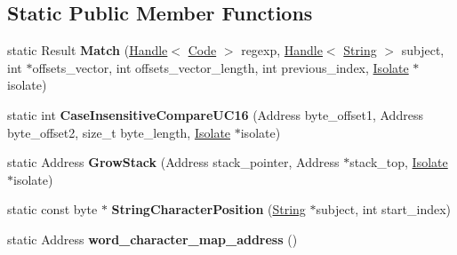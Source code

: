 \subsection*{Static Public Member Functions}
\begin{DoxyCompactItemize}
\item 
\hypertarget{classv8_1_1internal_1_1_native_reg_exp_macro_assembler_adf3c85eed3ff0ba2abc1f455bca600be}{}static Result {\bfseries Match} (\hyperlink{classv8_1_1internal_1_1_handle}{Handle}$<$ \hyperlink{classv8_1_1internal_1_1_code}{Code} $>$ regexp, \hyperlink{classv8_1_1internal_1_1_handle}{Handle}$<$ \hyperlink{classv8_1_1internal_1_1_string}{String} $>$ subject, int $\ast$offsets\+\_\+vector, int offsets\+\_\+vector\+\_\+length, int previous\+\_\+index, \hyperlink{classv8_1_1internal_1_1_isolate}{Isolate} $\ast$isolate)\label{classv8_1_1internal_1_1_native_reg_exp_macro_assembler_adf3c85eed3ff0ba2abc1f455bca600be}

\item 
\hypertarget{classv8_1_1internal_1_1_native_reg_exp_macro_assembler_af6141c631b2362416f8e9f83fff12e49}{}static int {\bfseries Case\+Insensitive\+Compare\+U\+C16} (Address byte\+\_\+offset1, Address byte\+\_\+offset2, size\+\_\+t byte\+\_\+length, \hyperlink{classv8_1_1internal_1_1_isolate}{Isolate} $\ast$isolate)\label{classv8_1_1internal_1_1_native_reg_exp_macro_assembler_af6141c631b2362416f8e9f83fff12e49}

\item 
\hypertarget{classv8_1_1internal_1_1_native_reg_exp_macro_assembler_a473d8e744726a35090f726c48927985c}{}static Address {\bfseries Grow\+Stack} (Address stack\+\_\+pointer, Address $\ast$stack\+\_\+top, \hyperlink{classv8_1_1internal_1_1_isolate}{Isolate} $\ast$isolate)\label{classv8_1_1internal_1_1_native_reg_exp_macro_assembler_a473d8e744726a35090f726c48927985c}

\item 
\hypertarget{classv8_1_1internal_1_1_native_reg_exp_macro_assembler_aee21c9c8a14dc0a4cae37b824b37b398}{}static const byte $\ast$ {\bfseries String\+Character\+Position} (\hyperlink{classv8_1_1internal_1_1_string}{String} $\ast$subject, int start\+\_\+index)\label{classv8_1_1internal_1_1_native_reg_exp_macro_assembler_aee21c9c8a14dc0a4cae37b824b37b398}

\item 
\hypertarget{classv8_1_1internal_1_1_native_reg_exp_macro_assembler_accf544c18ba07a35b990d2a71412a752}{}static Address {\bfseries word\+\_\+character\+\_\+map\+\_\+address} ()\label{classv8_1_1internal_1_1_native_reg_exp_macro_assembler_accf544c18ba07a35b990d2a71412a752}


\end{DoxyCompactItemize}
